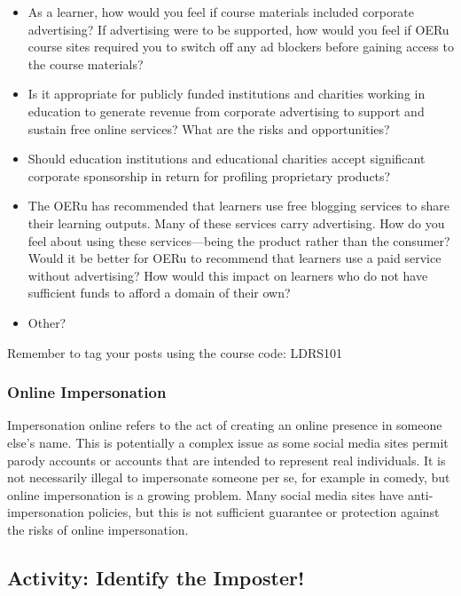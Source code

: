 \documentclass[
  letterpaper,
  DIV=11,
  numbers=noendperiod]{scrreprt}
\providecommand{\tightlist}{%
  \setlength{\itemsep}{0pt}\setlength{\parskip}{0pt}}\usepackage{longtable,booktabs,array}
\begin{document}
\begin{tcolorbox}
\begin{itemize}
\tightlist
\item
  As a learner, how would you feel if course materials included
  corporate advertising? If advertising were to be supported, how would
  you feel if OERu course sites required you to switch off any ad
  blockers before gaining access to the course materials?
\item
  Is it appropriate for publicly funded institutions and charities
  working in education to generate revenue from corporate advertising to
  support and sustain free online services? What are the risks and
  opportunities?
\item
  Should education institutions and educational charities accept
  significant corporate sponsorship in return for profiling proprietary
  products?
\item
  The OERu has recommended that learners use free blogging services to
  share their learning outputs. Many of these services carry
  advertising. How do you feel about using these services---being the
  product rather than the consumer? Would it be better for OERu to
  recommend that learners use a paid service without advertising? How
  would this impact on learners who do not have sufficient funds to
  afford a domain of their own?
\item
  Other?
\end{itemize}

Remember to tag your posts using the course code: LDRS101

\end{tcolorbox}

\subsubsection*{Online Impersonation}\label{online-impersonation}

Impersonation online refers to the act of creating an online presence in
someone else's name. This is potentially a complex issue as some social
media sites permit parody accounts or accounts that are intended to
represent real individuals. It is not necessarily illegal to impersonate
someone per se, for example in comedy, but online impersonation is a
growing problem. Many social media sites have anti-impersonation
policies, but this is not sufficient guarantee or protection against the
risks of online impersonation.

\subsection{Activity: Identify the
Imposter!}\label{activity-identify-the-imposter}
\end{document}
